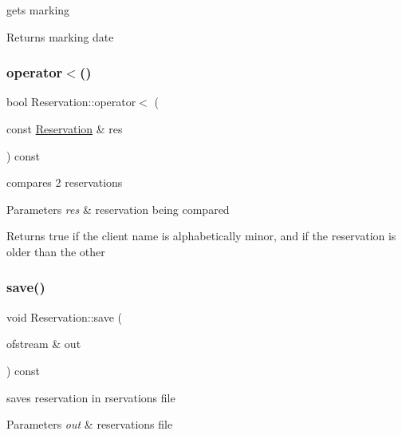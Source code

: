 gets marking 

\begin{DoxyReturn}{Returns}
marking date 
\end{DoxyReturn}
\hypertarget{class_reservation_a9d836b9dc4ff0a468cf7d91e9d0a0312}{}\label{class_reservation_a9d836b9dc4ff0a468cf7d91e9d0a0312} 
\subsubsection{\texorpdfstring{operator$<$()}{operator<()}}
{\footnotesize\ttfamily bool Reservation\+::operator$<$ (\begin{DoxyParamCaption}\item[{const \hyperlink{class_reservation}{Reservation} \&}]{res }\end{DoxyParamCaption}) const}



compares 2 reservations 


\begin{DoxyParams}{Parameters}
{\em res} & reservation being compared\\
\hline
\end{DoxyParams}
\begin{DoxyReturn}{Returns}
true if the client name is alphabetically minor, and if the reservation is older than the other 
\end{DoxyReturn}
\hypertarget{class_reservation_aaa4ab6143a49aeb8b4cac348bae44ea2}{}\label{class_reservation_aaa4ab6143a49aeb8b4cac348bae44ea2} 
\subsubsection{\texorpdfstring{save()}{save()}}
{\footnotesize\ttfamily void Reservation\+::save (\begin{DoxyParamCaption}\item[{ofstream \&}]{out }\end{DoxyParamCaption}) const}



saves reservation in rservations file 


\begin{DoxyParams}{Parameters}
{\em out} & reservations file \\
\hline
\end{DoxyParams}
\hypertarget{class_reservation_a17a9412b83e734b18692d007069e904e}{}\label{class_reservation_a17a9412b83e734b18692d007069e904e} 
